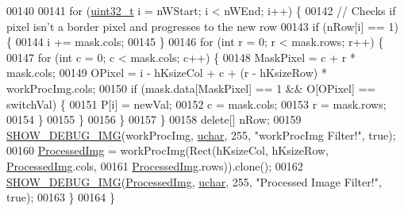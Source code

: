 \begin{DoxyCode}
00140 
00141   \textcolor{keywordflow}{for} (\hyperlink{_soil_math_types_8h_a435d1572bf3f880d55459d9805097f62}{uint32\_t} i = nWStart; i < nWEnd; i++) \{
00142     \textcolor{comment}{// Checks if pixel isn't a border pixel and progresses to the new row}
00143     \textcolor{keywordflow}{if} (nRow[i] == 1) \{
00144       i += mask.cols;
00145     \}
00146     \textcolor{keywordflow}{for} (\textcolor{keywordtype}{int} r = 0; r < mask.rows; r++) \{
00147       \textcolor{keywordflow}{for} (\textcolor{keywordtype}{int} c = 0; c < mask.cols; c++) \{
00148         MaskPixel = c + r * mask.cols;
00149         OPixel = i - hKsizeCol + c + (r - hKsizeRow) * workProcImg.cols;
00150         if (mask.data[MaskPixel] == 1 && O[OPixel] == switchVal) \{
00151           P[i] = newVal;
00152           c = mask.cols;
00153           r = mask.rows;
00154         \}
00155       \}
00156     \}
00157   \}
00158   \textcolor{keyword}{delete}[] nRow;
00159   \hyperlink{_vision_debug_8h_aae864fa4f990213a4184a209ff236202}{SHOW\_DEBUG\_IMG}(workProcImg, \hyperlink{_soil_math_types_8h_a65f85814a8290f9797005d3b28e7e5fc}{uchar}, 255, \textcolor{stringliteral}{"workProcImg Filter!"}, \textcolor{keyword}{true});
00160   \hyperlink{class_vision_1_1_image_processing_aa7d65742882cd1b2a1e4e9cb68809211}{ProcessedImg} = workProcImg(Rect(hKsizeCol, hKsizeRow, \hyperlink{class_vision_1_1_image_processing_aa7d65742882cd1b2a1e4e9cb68809211}{ProcessedImg}.cols,
00161                                   \hyperlink{class_vision_1_1_image_processing_aa7d65742882cd1b2a1e4e9cb68809211}{ProcessedImg}.rows)).clone();
00162   \hyperlink{_vision_debug_8h_aae864fa4f990213a4184a209ff236202}{SHOW\_DEBUG\_IMG}(\hyperlink{class_vision_1_1_image_processing_aa7d65742882cd1b2a1e4e9cb68809211}{ProcessedImg}, \hyperlink{_soil_math_types_8h_a65f85814a8290f9797005d3b28e7e5fc}{uchar}, 255, \textcolor{stringliteral}{"Processed Image Filter!"}, \textcolor{keyword}{true});
00163 \}
00164 \}
\end{DoxyCode}
